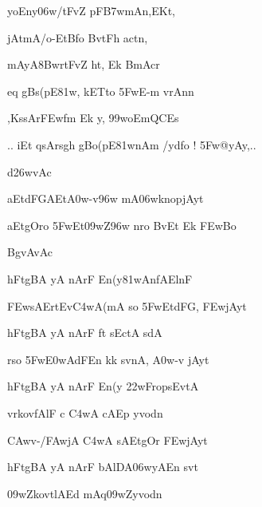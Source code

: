 {\dn yoEny\306w/tFv\5\?Z pF\3B7wmAn,EKt,{\dandabdn} \dontdisplaylinenum}

{\dn jAtmA/o-EtB\5\2fo BvtFh ac\?tn\?, \vegdn\dontdisplaylinenum}

{\dn mAyA\38BwrtFv\5\?Z ht, Ek\2 BmAcr\? \dontdisplaylinenum}

{\dn eq gB\0s(pE\381w, kETto \35FwE-m vrAnn\?{\dandadn}\dontdisplaylinenum }

{\dn {},Ks\2sAr\3FEwfm\2 Ek\2 y, \399woEmQCEs \vegdn\dontdisplaylinenum}

{\dn 
\jump
\begin{center}
{..} iEt qsArs\2g\5h\? gBo{\qvb}(pE\381wnA\0m /ydfo {\rs !\re} \35Fw@yAy,{..}
\end{center}\vers}
\bekveg\szamveg\vfill\phpspagebreak\szam\bek{}
\thispagestyle{empty}


\dnvers


\jump\jump 
{\dn d\?\326wvAc{\dandabdn}\dontdisplaylinenum }

{\dn aEtdFGA\0Et\3A0w-v\396w mA\306wk\?nopjAyt\?{\dandadn} \dontdisplaylinenum}

{\dn aEtgOro \35FwEt\309wZ\396w nro BvEt Ek\2 \3FEwBo \vegdn\dontdisplaylinenum}

{\dn BgvAvAc{\dandabdn}\dontdisplaylinenum }

{\dn {}hFtgBA\0 yA nArF En(y\381wAnfAElnF{\dandadn} \dontdisplaylinenum}

{\dn \3FEwsAErtEv\3C4wA(mA so \35FwEtdFG\0, \3FEwjAyt\? \vegdn\dontdisplaylinenum}

{\dn {}hFtgBA\0 yA nArF f\?t\? s\2EctA sdA{\dandabdn} \dontdisplaylinenum}

{\dn rso \35Fw\3E0wAdFEn kk\2 s\?vnA, \3A0w-v jAyt\? \vegdn\dontdisplaylinenum}

{\dn {}hFtgBA\0 yA nArF En(y\2 \322wFrops\?EvtA{\dandabdn} \dontdisplaylinenum}

{\dn vrkovfAlF c \3C4wA cAEp yvodn \vegdn\dontdisplaylinenum}

{\dn {}\3CAwv-/\3FAwjA \3C4wA sAEtgOr\2 \3FEwjAyt\?{\dandabdn} \dontdisplaylinenum}

{\dn {}hFtgBA\0 yA nArF bAlDA\306wyAEn s\?vt\? \vegdn\dontdisplaylinenum}

{\dn {}\309wZkovt\4lAEd mAq\309wZyvodn \dontdisplaylinenum}

